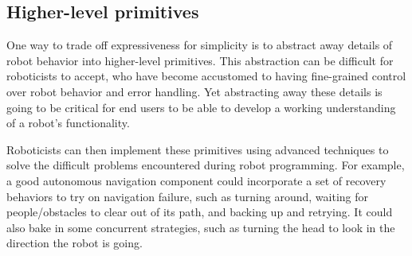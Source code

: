 \documentclass[10pt,twocolumn]{article}
\begin{document}

\subsection{Higher-level primitives}

One way to trade off expressiveness for simplicity is to abstract away details of robot behavior into higher-level primitives. This abstraction can be difficult for roboticists to accept, who have become accustomed to having fine-grained control over robot behavior and error handling. Yet abstracting away these details is going to be critical for end users to be able to develop a working understanding of a robot's functionality.


Roboticists can then implement these primitives using advanced techniques to solve the difficult problems encountered during robot programming.
For example, a good autonomous navigation component could incorporate a set of recovery behaviors to try on navigation failure, such as turning around, waiting for people/obstacles to clear out of its path, and backing up and retrying. It could also bake in some concurrent strategies, such as turning the head to look in the direction the robot is going. 

\end{document}
